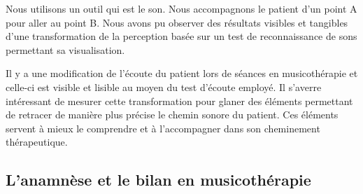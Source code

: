 Nous utilisons un outil qui est le son. Nous accompagnons
le patient d'un point A pour aller au point B.
Nous avons pu observer des résultats visibles et tangibles 
d'une transformation de la
perception basée sur un test de reconnaissance de sons permettant sa visualisation.

Il y a une modification de l'écoute du patient lors de séances en
musicothérapie et celle-ci est visible et lisible au moyen du test
d'écoute employé.
Il s'averre intéressant de mesurer cette transformation
pour glaner des éléments  permettant de
retracer de manière plus précise le chemin sonore du patient. Ces
éléments servent à mieux le comprendre 
et à l'accompagner dans son cheminement thérapeutique.

\subsection{L'anamnèse et le bilan en musicothérapie}


